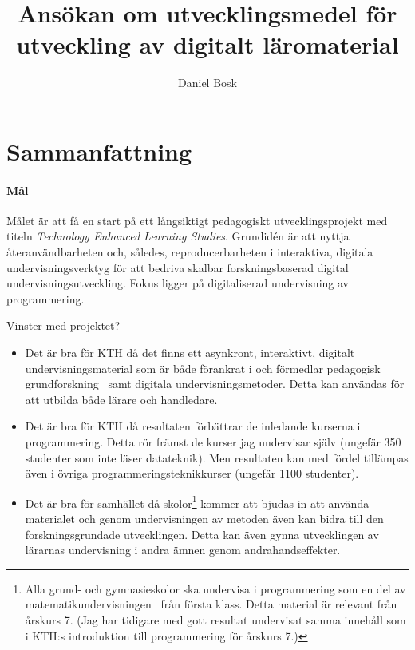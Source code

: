 \documentclass[a4paper,swedish]{article}
\title{Ansökan om utvecklingsmedel för utveckling av digitalt läromaterial}
\author{Daniel Bosk}
\affil{KTH EECS TCS, \texttt{dbosk@kth.se}}
\begin{document}
\maketitle

\section*{Sammanfattning}

\paragraph{Mål} Målet är att få en start på ett långsiktigt pedagogiskt 
utvecklingsprojekt med titeln \emph{Technology Enhanced Learning Studies}.
Grundidén är att nyttja återanvändbarheten och, således, reproducerbarheten i 
interaktiva, digitala undervisningsverktyg för att bedriva skalbar 
forskningsbaserad digital undervisningsutveckling.
Fokus ligger på digitaliserad undervisning av programmering.

Vinster med projektet?
\begin{itemize}
  \item Det är bra för KTH då det finns ett asynkront, interaktivt, digitalt 
    undervisningsmaterial som är både förankrat i och förmedlar pedagogisk 
    grundforskning~\parencite{NecessaryConditionsOfLearning} samt digitala 
    undervisningsmetoder.
    Detta kan användas för att utbilda både lärare och handledare.

  \item Det är bra för KTH då resultaten förbättrar de inledande kurserna i 
    programmering.
    Detta rör främst de kurser jag undervisar själv (ungefär 350 studenter som 
    inte läser datateknik).
    Men resultaten kan med fördel tillämpas även i övriga 
    programmeringsteknikkurser (ungefär 1100 studenter).

  \item Det är bra för samhället då skolor\footnote{%
      Alla grund- och gymnasieskolor ska undervisa i programmering som en del 
      av matematikundervisningen~\parencite{SkolverketGrProg,SkolverketGyProg} 
      från första klass.
      Detta material är relevant från årskurs 7.
      (Jag har tidigare med gott resultat undervisat samma innehåll som i KTH:s 
      introduktion till programmering för årskurs 7.)
    } kommer att bjudas in att använda materialet och genom undervisningen av 
    metoden även kan bidra till den forskningsgrundade utvecklingen.
    Detta kan även gynna utvecklingen av lärarnas undervisning i andra ämnen 
    genom andrahandseffekter.
\end{itemize}
\end{document}
